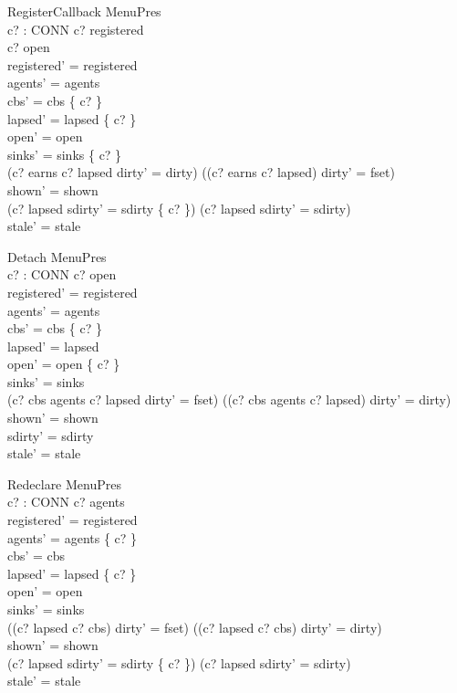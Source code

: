 \documentclass[a4paper,10pt,fleqn]{article}
\begin{document}
\begin{schema}{RegisterCallback}
  \Delta MenuPres \\
  c? : CONN
\where
  c? \in registered \\
  c? \in open \\
  registered' = registered \\
  agents' = agents \\
  cbs' = cbs \cup \{ c? \} \\
  lapsed' = lapsed \setminus \{ c? \} \\
  open' = open \\
  sinks' = sinks \oplus \{ c?  \} \\
  (c? \in earns \land c? \notin lapsed \land dirty' = dirty) \lor
    ((c? \notin earns \lor c? \in lapsed) \land dirty' = fset) \\
  shown' = shown \\
  (c? \in lapsed \land sdirty' = sdirty \cup \{ c? \}) \lor
    (c? \notin lapsed \land sdirty' = sdirty) \\
  stale' = stale
\end{schema}

\begin{schema}{Detach}
  \Delta MenuPres \\
  c? : CONN
\where
  c? \in open \\
  registered' = registered \\
  agents' = agents \\
  cbs' = cbs \setminus \{ c? \} \\
  lapsed' = lapsed \\
  open' = open \setminus \{ c? \} \\
  sinks' = sinks \\
  (c? \in cbs \setminus agents \land c? \notin lapsed \land dirty' = fset) \lor
    (\lnot (c? \in cbs \setminus agents \land c? \notin lapsed) \land dirty' = dirty) \\
  shown' = shown \\
  sdirty' = sdirty \\
  stale' = stale
\end{schema}

\begin{schema}{Redeclare}
  \Delta MenuPres \\
  c? : CONN
\where
  c? \in agents \\
  registered' = registered \\
  agents' = agents \setminus \{ c? \} \\
  cbs' = cbs \\
  lapsed' = lapsed \setminus \{ c? \} \\
  open' = open \\
  sinks' = sinks \\
  ((c? \in lapsed \lor c? \notin cbs) \land dirty' = fset) \lor
    (\lnot (c? \in lapsed \lor c? \notin cbs) \land dirty' = dirty) \\
  shown' = shown \\
  (c? \in lapsed \land sdirty' = sdirty \cup \{ c? \}) \lor
    (c? \notin lapsed \land sdirty' = sdirty) \\
  stale' = stale
\end{schema}
\end{document}
